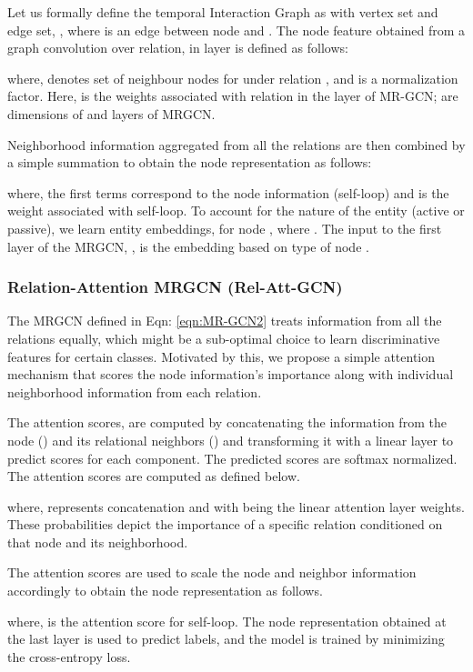 \documentclass[letterpaper, 10 pt, conference]{ieeeconf}
\begin{document}
Let us formally define the temporal Interaction Graph as  with vertex set  and edge set, , where  is an edge between node  and . The  node feature obtained from a graph convolution over relation,  in  layer is defined as follows:

where,  denotes set of neighbour nodes for  under relation ,  and  is a normalization factor. Here,  is the weights associated with relation  in the  layer of MR-GCN;   are dimensions of  and  layers of MRGCN. 

Neighborhood information aggregated from all the relations are then combined by a simple summation to obtain the node representation as follows:

where, the first terms correspond to the node information (self-loop) and  is the weight associated with self-loop. To account for the nature of the entity (active or passive), we learn entity embeddings,  for node , where . The input to the first layer of the MRGCN, , is the embedding  based on type of node .    

\subsubsection{Relation-Attention MRGCN (Rel-Att-GCN)}
\label{sec:attention}
The MRGCN defined in Eqn: \ref{eqn:MR-GCN2} treats information from all the relations equally, which might be a sub-optimal choice to learn discriminative features for certain classes. Motivated by this, we propose a simple attention mechanism that scores the node information's importance along with individual neighborhood information from each relation.

The attention scores,  are computed by concatenating the information from the node () and its relational neighbors ()  and transforming it with a linear layer to predict scores for each component. The predicted scores are softmax normalized. The attention scores are computed as defined below.

where,  represents concatenation and  with  being the linear attention layer weights. These probabilities  depict the importance of a specific relation conditioned on that node and its neighborhood. 

The attention scores are used to scale the node and neighbor information accordingly to obtain the node representation as follows.

where,  is the attention score for self-loop.
The node representation obtained at the last layer is used to predict labels, and the model is trained by minimizing the cross-entropy loss.
\end{document}
